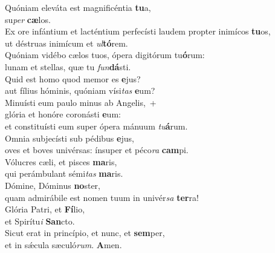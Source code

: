 \evenverse Quóniam eleváta est magnificéntia \textbf{tu}a,~\*\\
\evenverse su\textit{per} \textbf{cæ}los.\\
\oddverse Ex ore infántium et lacténtium perfecísti laudem propter inimícos \textbf{tu}os,~\*\\
\oddverse ut déstruas inimícum et \textit{ul}\textbf{tó}rem.\\
\evenverse Quóniam vidébo cælos tuos, ópera digitórum tu\textbf{ó}rum:~\*\\
\evenverse lunam et stellas, quæ tu \textit{fun}\textbf{dá}sti.\\
\oddverse Quid est homo quod memor es \textbf{e}jus?~\*\\
\oddverse aut fílius hóminis, quóniam vísi\textit{tas} \textbf{e}um?\\
\evenverse Minuísti eum paulo minus ab Angelis,~+\\
\evenverse  glória et honóre coronásti \textbf{e}um:~\*\\
\evenverse et constituísti eum super ópera mánuum \textit{tu}\textbf{á}rum.\\
\oddverse Omnia subjecísti sub pédibus \textbf{e}jus,~\*\\
\oddverse oves et boves univérsas: ínsuper et péco\textit{ra} \textbf{cam}pi.\\
\evenverse Vólucres cæli, et pisces \textbf{ma}ris,~\*\\
\evenverse qui perámbulant sémi\textit{tas} \textbf{ma}ris.\\
\oddverse Dómine, Dóminus \textbf{no}ster,~\*\\
\oddverse quam admirábile est nomen tuum in univér\textit{sa} \textbf{ter}ra!\\
\evenverse Glória Patri, et \textbf{Fí}lio,~\*\\
\evenverse et Spirítu\textit{i} \textbf{San}cto.\\
\oddverse Sicut erat in princípio, et nunc, et \textbf{sem}per,~\*\\
\oddverse et in sǽcula sæculó\textit{rum}. \textbf{A}men.\\
